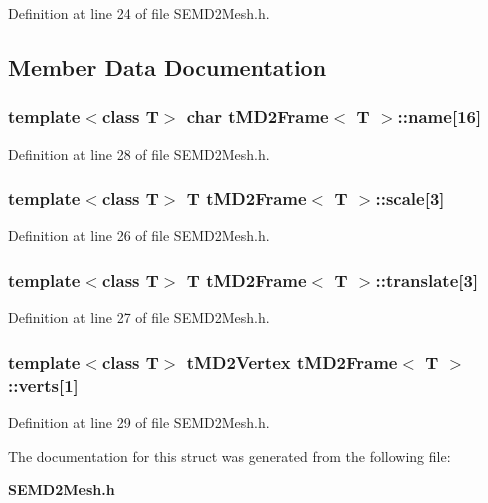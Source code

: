 Definition at line 24 of file S\+E\+M\+D2\+Mesh.\+h.



\subsection{Member Data Documentation}
\subsubsection[{name}]{\setlength{\rightskip}{0pt plus 5cm}template$<$class T$>$ char {\bf t\+M\+D2\+Frame}$<$ T $>$\+::name[16]}\label{structt_m_d2_frame_a0740888ce8e6dbc168b68f2b91497c97}


Definition at line 28 of file S\+E\+M\+D2\+Mesh.\+h.

\subsubsection[{scale}]{\setlength{\rightskip}{0pt plus 5cm}template$<$class T$>$ T {\bf t\+M\+D2\+Frame}$<$ T $>$\+::scale[3]}\label{structt_m_d2_frame_aa447d24a02f5a25c43b274a793bcd84c}


Definition at line 26 of file S\+E\+M\+D2\+Mesh.\+h.

\subsubsection[{translate}]{\setlength{\rightskip}{0pt plus 5cm}template$<$class T$>$ T {\bf t\+M\+D2\+Frame}$<$ T $>$\+::translate[3]}\label{structt_m_d2_frame_ad2f3600736f277054a60cac562cb8b24}


Definition at line 27 of file S\+E\+M\+D2\+Mesh.\+h.

\subsubsection[{verts}]{\setlength{\rightskip}{0pt plus 5cm}template$<$class T$>$ {\bf t\+M\+D2\+Vertex} {\bf t\+M\+D2\+Frame}$<$ T $>$\+::verts[1]}\label{structt_m_d2_frame_a5a4d249569153d25bcfad2e43b5c8df0}


Definition at line 29 of file S\+E\+M\+D2\+Mesh.\+h.



The documentation for this struct was generated from the following file\+:\begin{DoxyCompactItemize}
\item 
{\bf S\+E\+M\+D2\+Mesh.\+h}\end{DoxyCompactItemize}
